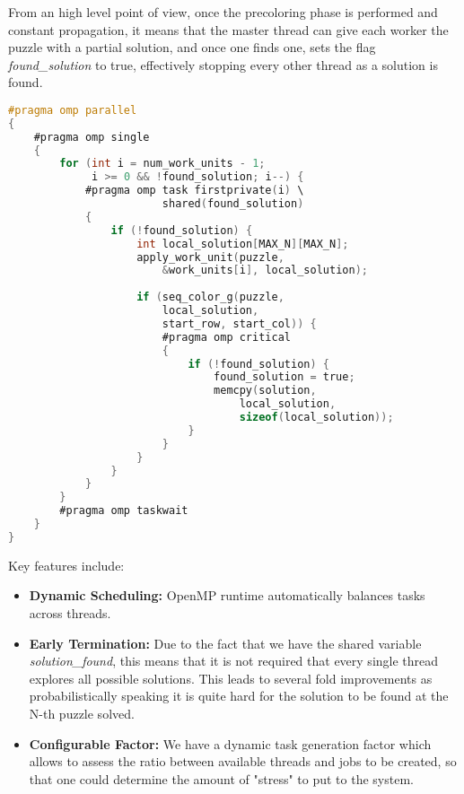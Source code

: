 From an high level point of view, once the precoloring phase is performed and constant propagation, it means that the master thread can give each worker the puzzle with a partial solution, and once one finds one, sets the flag \textit{found\_solution} to true, effectively stopping every other thread as a solution is found. 


\begin{lstlisting}[language=C, caption=OpenMP task generation, label={listing:omp_algorithm}]
#pragma omp parallel
{
    #pragma omp single
    {
        for (int i = num_work_units - 1; 
             i >= 0 && !found_solution; i--) {
            #pragma omp task firstprivate(i) \
                        shared(found_solution)
            {
                if (!found_solution) {
                    int local_solution[MAX_N][MAX_N];
                    apply_work_unit(puzzle, 
                        &work_units[i], local_solution);
                    
                    if (seq_color_g(puzzle, 
                        local_solution, 
                        start_row, start_col)) {
                        #pragma omp critical
                        {
                            if (!found_solution) {
                                found_solution = true;
                                memcpy(solution, 
                                    local_solution, 
                                    sizeof(local_solution));
                            }
                        }
                    }
                }
            }
        }
        #pragma omp taskwait
    }
}
\end{lstlisting}

Key features include:
\begin{itemize}
    \item \textbf{Dynamic Scheduling:} OpenMP runtime automatically balances tasks across threads.
    \item \textbf{Early Termination:} Due to the fact that we have the shared variable \textit{solution\_found}, this means that it is not required that every single thread explores all possible solutions. This leads to several fold improvements as probabilistically speaking it is quite hard for the solution to be found at the N-th puzzle solved.
    \item \textbf{Configurable Factor:} We have a dynamic task generation factor which allows to assess the ratio between available threads and jobs to be created, so that one could determine the amount of "stress" to put to the system.
\end{itemize}



